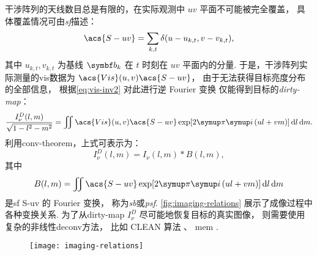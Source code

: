 干涉阵列的天线数目总是有限的，在实际观测中 $uv$ 平面不可能被完全覆盖，
具体覆盖情况可由\emph{\acf{sf}}描述：
\begin{equation}
  \label{eq:sf}
  \acs{S-uv} = \sum_{k,t} \delta(u - u_{k,t}, v - v_{k,t}),
\end{equation}
其中 $u_{k,t}, v_{k,t}$ 为基线 $\B{b}_k$ 在 $t$ 时刻在 $uv$ 平面内的分量.
于是，干涉阵列实际测量的\acl{vis}数据为 $\acs{Vis}(u,v) \acs{S-uv}$，
由于无法获得目标亮度分布的全部信息，
根据\autoref{eq:vis-inv2} 对此进行逆 Fourier 变换
仅能得到目标的\emph{\acf{dirty-map}}：
\begin{equation}
  \label{eq:dirty-map}
  \frac{I_{\nu}^D(l,m)}{\sqrt{1-l^2-m^2}} = \iint
    \acs{Vis}(u,v) \acs{S-uv} \exp [2\Cpi\Ci\, (ul+vm)] \D{l}\D{m}.
\end{equation}
利用\ac{conv-theorem}，上式可表示为：
\begin{equation}
  I_{\nu}^D(l,m) = I_{\nu}(l,m) * B(l,m),
\end{equation}
其中
\begin{equation}
  \label{eq:syn-beam}
  B(l,m) = \iint \acs{S-uv} \exp [2\Cpi\Ci\, (ul+vm)] \D{l}\D{m}
\end{equation}
是\acl{sf} \acs{S-uv} 的 Fourier 变换，
称为\emph{\ac{sb}}或\emph{\ac{psf}}.
\autoref{fig:imaging-relations} 展示了成像过程中各种变换关系.
为了从\acl{dirty-map} $I_{\nu}^D$ 尽可能地恢复目标的真实图像，
则需要使用复杂的非线性\ac{deconv}方法，
比如 CLEAN 算法 \cite{hogbom1974,cornwell1999}、
\ac{mem} \cite{narayan1986}.

\begin{figure}[htp]
  \centering
  \texttt{[image: imaging-relations]}
  \label{fig:imaging-relations}
\end{figure}

